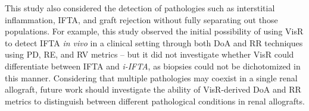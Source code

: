This study also considered the detection of pathologies such as interstitial inflammation, IFTA, and graft rejection without fully separating out those populations. For example, this study observed the initial possibility of using VisR to detect IFTA \emph{in vivo} in a clinical setting through both DoA and RR techniques using PD, RE, and RV metrics -- but it did not investigate whether VisR could differentiate between IFTA and \emph{i-IFTA}, as biopsies could not be dichotomized in this manner. Considering that multiple pathologies may coexist in a single renal allograft, future work should investigate the ability of VisR-derived DoA and RR metrics to distinguish between different pathological conditions in renal allografts.

%
%

